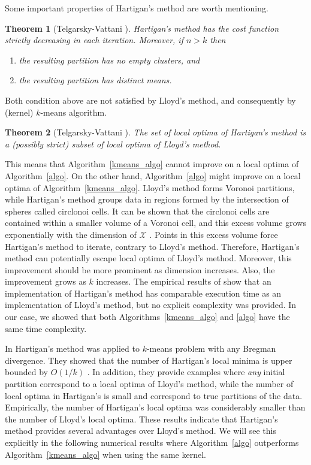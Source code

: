 \documentclass[aps,preprint,nofootinbib,floatfix]{revtex4-1}
\newtheorem{theorem}{Theorem}
\begin{document}
Some important properties of Hartigan's method 
are worth mentioning. 

\begin{theorem}[Telgarsky-Vattani \cite{Telgarsky}]
Hartigan's method has the cost function strictly decreasing in each
iteration. Moreover, if $n > k$ then 
\begin{enumerate}
\item \label{noempty} the resulting partition has no empty clusters, and
\item \label{diffmean} the resulting partition has distinct means.
\end{enumerate}
\end{theorem}

Both condition above are not satisfied 
by Lloyd's method, and consequently by (kernel) $k$-means algorithm.

\begin{theorem}[Telgarsky-Vattani \cite{Telgarsky}]
The set of local optima of Hartigan's method is a (possibly strict) subset
of local optima of Lloyd's method.
\end{theorem}

This means that Algorithm~\ref{kmeans_algo} cannot
improve on a local optima of Algorithm~\ref{algo}. On the other hand,
Algorithm~\ref{algo} might improve on a local optima of 
Algorithm~\ref{kmeans_algo}. Lloyd's method forms Voronoi partitions,
while Hartigan's method groups data
in regions formed by the intersection of spheres called circlonoi cells.
It can be shown that the circlonoi cells are contained within
a smaller volume of a Voronoi cell, and this excess volume grows
exponentially with the dimension of $\mathcal{X}$ 
\cite[Theorems 2.4 and 3.1]{Telgarsky}. 
Points in this excess volume
force Hartigan's method to iterate, contrary
to Lloyd's method. Therefore, Hartigan's method 
can potentially escape local
optima of Lloyd's method. 
Moreover, this improvement should be more prominent as
dimension increases. Also, the improvement grows as $k$
increases.
The empirical results of \cite{Telgarsky} show that 
an implementation of Hartigan's method has comparable execution time 
as an implementation of
Lloyd's method,
but no explicit complexity was provided. In our case, we showed that both
Algorithms~\ref{kmeans_algo} and \ref{algo} have the same time complexity.

In \cite{Slonin} Hartigan's method was applied to $k$-means problem
with any Bregman divergence. They showed that the number of Hartigan's
local minima is upper bounded by $O(1/k)$ \cite[Proposition 5.1]{Slonin}. 
In addition, they provide examples where
\emph{any} initial partition correspond to a local optima of Lloyd's 
method, while  the number of local optima in Hartigan's is small and 
correspond to true partitions of the data. Empirically, the number of
Hartigan's local optima was considerably smaller than the number of Lloyd's
local optima.
These results indicate that Hartigan's method
provides several advantages over Lloyd's method. 
We will see this explicitly in the following 
numerical results where Algorithm~\ref{algo}
outperforms Algorithm~\ref{kmeans_algo} when using the same kernel.
\end{document}
